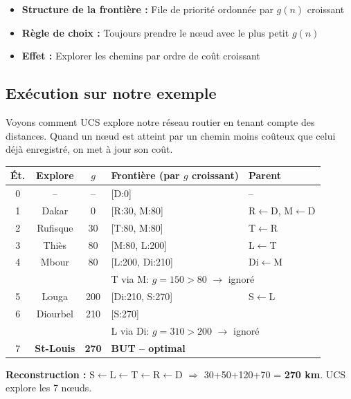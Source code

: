 \documentclass[11pt,a4paper]{article}
\begin{document}
\begin{recipebox}
\begin{itemize}
    \item \textbf{Structure de la frontière :} File de priorité ordonnée par $g(n)$ croissant
    \item \textbf{Règle de choix :} Toujours prendre le nœud avec le plus petit $g(n)$
    \item \textbf{Effet :} Explorer les chemins par ordre de coût croissant
\end{itemize}
\end{recipebox}

\subsection{Exécution sur notre exemple}

Voyons comment UCS explore notre réseau routier en tenant compte des distances. Quand un nœud est atteint par un chemin moins coûteux que celui déjà enregistré, on met à jour son coût.

{\small
\begin{center}
\begin{tabular}{|c|c|c|l|l|}
\hline
\textbf{Ét.} & \textbf{Explore} & $g$ & \textbf{Frontière (par $g$ croissant)} & \textbf{Parent} \\
\hline
0 & -- & -- & [D:0] & -- \\
1 & Dakar & 0 & [R:30, M:80] & R$\leftarrow$D, M$\leftarrow$D \\
2 & Rufisque & 30 & [T:80, M:80] & T$\leftarrow$R \\
3 & Thiès & 80 & [M:80, L:200] & L$\leftarrow$T \\
4 & Mbour & 80 & [L:200, Di:210] & Di$\leftarrow$M \\
  & & & \multicolumn{2}{l|}{\scriptsize T via M: $g{=}150 > 80$ $\rightarrow$ ignoré} \\
5 & Louga & 200 & [Di:210, S:270] & S$\leftarrow$L \\
6 & Diourbel & 210 & [S:270] & \\
  & & & \multicolumn{2}{l|}{\scriptsize L via Di: $g{=}310 > 200$ $\rightarrow$ ignoré} \\
7 & \textbf{St-Louis} & \textbf{270} & \textbf{BUT -- optimal} & \\
\hline
\end{tabular}
\end{center}
}

\textbf{Reconstruction :} S$\leftarrow$L$\leftarrow$T$\leftarrow$R$\leftarrow$D $\Rightarrow$ 30+50+120+70 = \textbf{270 km}. UCS explore les 7 nœuds.
\end{document}
